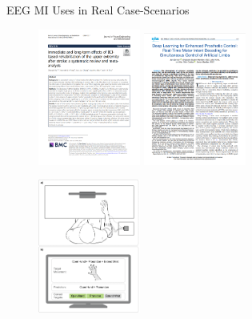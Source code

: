 \begin{frame}{EEG MI Uses in Real Case-Scenarios}
\begin{figure}
    \includegraphics[width=0.3\textwidth]{figures/literature/realcase/StrokeRehabilitation_paper}
    \includegraphics[width=0.3\textwidth]{figures/literature/realcase/ProsthesisControl_paper}
\end{figure}
\vspace*{-4cm}
\begin{figure}
    \includegraphics[width=0.3\textwidth]{figures/literature/realcase/limb_control}
\end{figure}
\end{frame}
